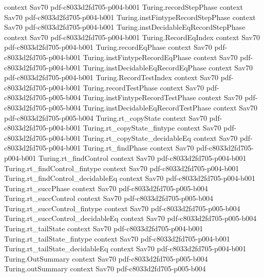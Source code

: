 \begin{theorem}
  {context}
  {Sav70}
  {pdf-c8033d2fd705-p004-b001}
\proofstep
  {Turing.recordStepPhase}
  {context}
  {Sav70}
  {pdf-c8033d2fd705-p004-b001}
\proofstep
  {Turing.instFintypeRecordStepPhase}
  {context}
  {Sav70}
  {pdf-c8033d2fd705-p004-b001}
\proofstep
  {Turing.instDecidableEqRecordStepPhase}
  {context}
  {Sav70}
  {pdf-c8033d2fd705-p004-b001}
\proofstep
  {Turing.RecordEqIndex}
  {context}
  {Sav70}
  {pdf-c8033d2fd705-p004-b001}
\proofstep
  {Turing.recordEqPhase}
  {context}
  {Sav70}
  {pdf-c8033d2fd705-p004-b001}
\proofstep
  {Turing.instFintypeRecordEqPhase}
  {context}
  {Sav70}
  {pdf-c8033d2fd705-p004-b001}
\proofstep
  {Turing.instDecidableEqRecordEqPhase}
  {context}
  {Sav70}
  {pdf-c8033d2fd705-p004-b001}
\proofstep
  {Turing.RecordTestIndex}
  {context}
  {Sav70}
  {pdf-c8033d2fd705-p004-b001}
\proofstep
  {Turing.recordTestPhase}
  {context}
  {Sav70}
  {pdf-c8033d2fd705-p005-b004}
\proofstep
  {Turing.instFintypeRecordTestPhase}
  {context}
  {Sav70}
  {pdf-c8033d2fd705-p005-b004}
\proofstep
  {Turing.instDecidableEqRecordTestPhase}
  {context}
  {Sav70}
  {pdf-c8033d2fd705-p005-b004}
\proofstep
  {Turing.rt_copyState}
  {context}
  {Sav70}
  {pdf-c8033d2fd705-p004-b001}
\proofstep
  {Turing.rt_copyState_fintype}
  {context}
  {Sav70}
  {pdf-c8033d2fd705-p004-b001}
\proofstep
  {Turing.rt_copyState_decidableEq}
  {context}
  {Sav70}
  {pdf-c8033d2fd705-p004-b001}
\proofstep
  {Turing.rt_findPhase}
  {context}
  {Sav70}
  {pdf-c8033d2fd705-p004-b001}
\proofstep
  {Turing.rt_findControl}
  {context}
  {Sav70}
  {pdf-c8033d2fd705-p004-b001}
\proofstep
  {Turing.rt_findControl_fintype}
  {context}
  {Sav70}
  {pdf-c8033d2fd705-p004-b001}
\proofstep
  {Turing.rt_findControl_decidableEq}
  {context}
  {Sav70}
  {pdf-c8033d2fd705-p004-b001}
\proofstep
  {Turing.rt_succPhase}
  {context}
  {Sav70}
  {pdf-c8033d2fd705-p005-b004}
\proofstep
  {Turing.rt_succControl}
  {context}
  {Sav70}
  {pdf-c8033d2fd705-p005-b004}
\proofstep
  {Turing.rt_succControl_fintype}
  {context}
  {Sav70}
  {pdf-c8033d2fd705-p005-b004}
\proofstep
  {Turing.rt_succControl_decidableEq}
  {context}
  {Sav70}
  {pdf-c8033d2fd705-p005-b004}
\proofstep
  {Turing.rt_tailState}
  {context}
  {Sav70}
  {pdf-c8033d2fd705-p004-b001}
\proofstep
  {Turing.rt_tailState_fintype}
  {context}
  {Sav70}
  {pdf-c8033d2fd705-p004-b001}
\proofstep
  {Turing.rt_tailState_decidableEq}
  {context}
  {Sav70}
  {pdf-c8033d2fd705-p004-b001}
\proofstep
  {Turing.OutSummary}
  {context}
  {Sav70}
  {pdf-c8033d2fd705-p005-b004}
\proofstep
  {Turing.outSummary}
  {context}
  {Sav70}
  {pdf-c8033d2fd705-p005-b004}

\end{theorem}
